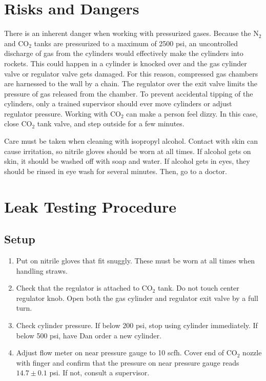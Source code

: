 \documentclass[12pt]{article}
\begin{document}
\section{Risks and Dangers}
There is an inherent danger when working with pressurized gases. Because the N$_2$ and CO$_2$ tanks are pressurized to a maximum of 2500 psi, an uncontrolled discharge of gas from the cylinders would effectively make the cylinders into rockets. This could happen in a cylinder is knocked over and the gas cylinder valve or regulator valve gets damaged. For this reason, compressed gas chambers are harnessed to the wall by a chain. The regulator over the exit valve limits the pressure of gas released from the chamber. To prevent accidental tipping of the cylinders, only a trained supervisor should ever move cylinders or adjust regulator pressure. Working with CO$_2$ can make a person feel dizzy. In this case, close CO$_2$ tank valve, and step outside for a few minutes.

Care must be taken when cleaning with isopropyl alcohol. Contact with skin can cause irritation, so nitrile gloves should be worn at all times. If alcohol gets on skin, it should be washed off with soap and water. If alcohol gets in eyes, they should be rinsed in eye wash for several minutes. Then, go to a doctor.


\newpage

\section{Leak Testing Procedure}

\subsection{Setup}

\begin{enumerate}
	\item Put on nitrile gloves that fit snuggly. These must be worn at all times when handling straws.
	\item Check that the regulator is attached to CO$_2$ tank. Do not touch center regulator knob. Open both the gas cylinder and regulator exit valve by a full turn. 
	\item Check cylinder pressure. If below 200 psi, stop using cylinder immediately. If below 500 psi, have Dan order a new cylinder.
	\item Adjust flow meter on near pressure gauge to 10 scfh. Cover end of CO$_2$ nozzle with finger and confirm that the pressure on near pressure gauge reads $14.7 \pm 0.1$ psi. If not, consult a supervisor.
\end{enumerate}
\end{document}
